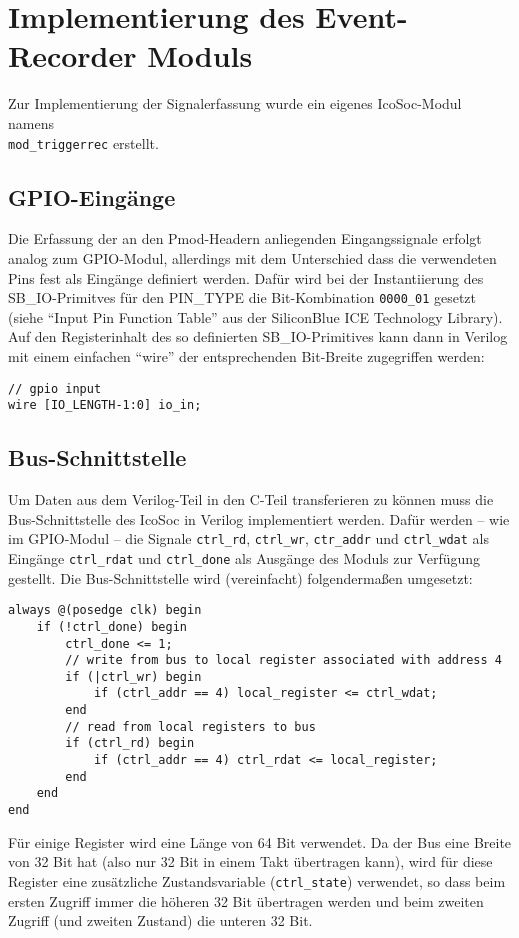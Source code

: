 {\section{Implementierung des Event-Recorder Moduls}
\label{ch:Implementierung:sec:Event-Recorder}

Zur Implementierung der Signalerfassung wurde ein eigenes IcoSoc-Modul namens \\{\tt mod\_triggerrec} erstellt.
\subsection{GPIO-Eingänge}
Die Erfassung der an den Pmod-Headern anliegenden Eingangssignale erfolgt analog zum GPIO-Modul, allerdings mit dem Unterschied dass die verwendeten Pins fest als Eingänge definiert werden.
Dafür wird bei der Instantiierung des SB\_IO-Primitves für den PIN\_TYPE die Bit-Kombination {\tt 0000\_01} gesetzt (siehe ``Input Pin Function Table'' aus der SiliconBlue ICE Technology Library\cite[S.~73]{doc:tec_lib}).\\ 
Auf den Registerinhalt des so definierten SB\_IO-Primitives kann dann in Verilog mit einem einfachen ``wire'' der entsprechenden Bit-Breite zugegriffen werden:
\begin{verbatim}
// gpio input
wire [IO_LENGTH-1:0] io_in;
\end{verbatim}

\subsection{Bus-Schnittstelle}
Um Daten aus dem Verilog-Teil in den C-Teil transferieren zu können muss die Bus-Schnittstelle des IcoSoc in Verilog implementiert werden.
Dafür werden -- wie im GPIO-Modul -- die Signale {\tt ctrl\_rd}, {\tt ctrl\_wr}, {\tt ctr\_addr} und {\tt ctrl\_wdat} als Eingänge {\tt ctrl\_rdat} und {\tt ctrl\_done} als Ausgänge des Moduls zur Verfügung gestellt.
Die Bus-Schnittstelle wird (vereinfacht) folgendermaßen umgesetzt:
\begin{verbatim}
always @(posedge clk) begin		
	if (!ctrl_done) begin
		ctrl_done <= 1;
		// write from bus to local register associated with address 4
		if (|ctrl_wr) begin
			if (ctrl_addr == 4) local_register <= ctrl_wdat;
		end
		// read from local registers to bus
		if (ctrl_rd) begin
			if (ctrl_addr == 4) ctrl_rdat <= local_register;
		end
	end
end
\end{verbatim}

Für einige Register wird eine Länge von 64 Bit verwendet. Da der Bus eine Breite von 32 Bit hat (also nur 32 Bit in einem Takt übertragen kann), wird für diese Register eine zusätzliche Zustandsvariable ({\tt ctrl\_state}) verwendet, so dass beim ersten Zugriff immer die höheren 32 Bit übertragen werden und beim zweiten Zugriff (und zweiten Zustand) die unteren 32 Bit. 

}
